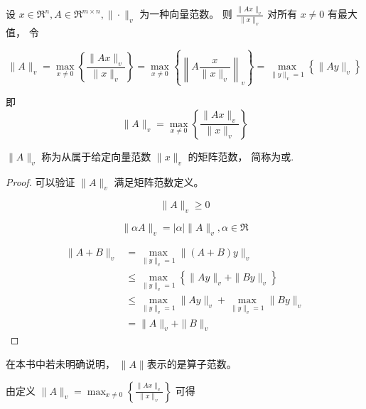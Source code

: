 \begin{definition}
    设 $ x \in \mathfrak{R}^{n}, A \in \mathfrak{R}^{m \times n},\|\cdot\|_{v} $ 为一种向量范数。 则 $ \frac{\|A x\|_{v}}{\|x\|_{v}} $ 对所有 $ x \neq 0 $ 有最大值， 令

    \begin{equation} \|A\|_{v}=\max _{x \neq 0}\left\{\frac{\|A x\|_{v}}{\|x\|_{v}}\right\}=\max _{x \neq 0}\left\{\left\|A \frac{x}{\|x\|_{v}}\right\|_{v}\right\}=\max _{\|y\|_{v}=1}\left\{\|A y\|_{v}\right\} \end{equation}

    即\begin{equation} \|A\|_{v}=\max _{x \neq 0}\left\{\frac{\|A x\|_{v}}{\|x\|_{v}}\right\} \end{equation}

    $ \|A\|_{v} $ 称为从属于给定向量范数 $ \|x\|_{v} $ 的矩阵范数， 简称为或.
\end{definition}

\begin{proof}
    可以验证 $ \|A\|_{v} $ 满足矩阵范数定义。 

    \begin{equation} \|A\|_{v} \geq 0 \end{equation}

    \begin{equation} \|\alpha A\|_{v}=|\alpha|\|A\|_{v}, \alpha \in \mathfrak{R} \end{equation}

    \begin{equation}\begin{aligned}
        \|A+B\|_{v} &=\max _{\|y\|_{v}=1}\|(A+B) y\|_{v} \\
        &\leq \max _{\|y\|_{v}=1}\left\{\|A y\|_{v}+\|B y\|_{v}\right\} \\
        & \leq \max _{\|y\|_{v}=1}\|A y\|_{v}+\max _{\|y\|_{v}=1}\|B y\|_{v} \\
        & =\|A\|_{v}+\|B\|_{v}
    \end{aligned}\end{equation}

\end{proof}

\begin{remark}
    在本书中若未明确说明， $\|A \|$表示的是算子范数。
\end{remark}

由定义 $ \|A\|_{v}=\max _{x \neq 0}\left\{\frac{\|A x\|_{v}}{\|x\|_{v}}\right\} $ 可得

